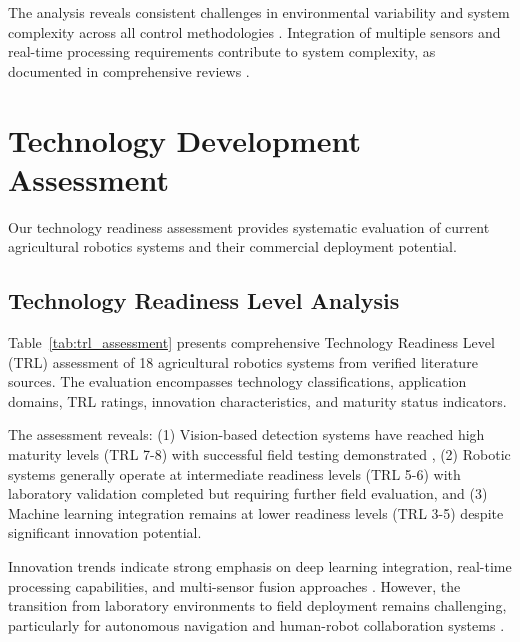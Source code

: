 \documentclass{ieeeaccess}
\begin{document}


The analysis reveals consistent challenges in environmental variability and system complexity across all control methodologies \cite{bac2014harvesting,fountas2020agricultural}. Integration of multiple sensors and real-time processing requirements contribute to system complexity, as documented in comprehensive reviews \cite{oliveira2021advances}.

\section{Technology Development Assessment}
\label{sec:trends}

Our technology readiness assessment provides systematic evaluation of current agricultural robotics systems and their commercial deployment potential.

\subsection{Technology Readiness Level Analysis}

Table~\ref{tab:trl_assessment} presents comprehensive Technology Readiness Level (TRL) assessment of 18 agricultural robotics systems from verified literature sources. The evaluation encompasses technology classifications, application domains, TRL ratings, innovation characteristics, and maturity status indicators.

The assessment reveals: (1) Vision-based detection systems have reached high maturity levels (TRL 7-8) with successful field testing demonstrated \cite{tang2020recognition}, (2) Robotic systems generally operate at intermediate readiness levels (TRL 5-6) with laboratory validation completed but requiring further field evaluation, and (3) Machine learning integration remains at lower readiness levels (TRL 3-5) despite significant innovation potential.



Innovation trends indicate strong emphasis on deep learning integration, real-time processing capabilities, and multi-sensor fusion approaches \cite{zhou2022intelligent,lytridis2021overview}. However, the transition from laboratory environments to field deployment remains challenging, particularly for autonomous navigation and human-robot collaboration systems \cite{navas2021soft}.
\end{document}
